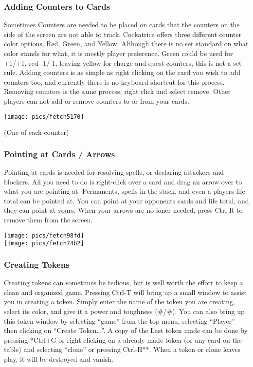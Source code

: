 \documentclass[a4paper]{scrbook}
\begin{document}
\subsubsection{Adding Counters to Cards}
Sometimes Counters are needed to be placed on cards that the counters on the side of the screen are not able to track. Cockatrice offers three different counter color options, Red, Green, and Yellow. Although there is no set standard on what color stands for what, it is mostly player preference. Green could be used for +1/+1, red -1/-1, leaving yellow for charge and quest counters, this is not a set rule. Adding counters is as simple as right clicking on the card you wish to add counters too, and currently there is no keyboard shortcut for this process. Removing counters is the same process, right click and select remove. Other players can not add or remove counters to or from your cards.

\begin{center}
\texttt{[image: pics/fetch5170]}
\end{center}
(One of each counter)

\subsubsection{Pointing at Cards / Arrows}
Pointing at cards is needed for resolving spells, or declaring attackers and blockers. All you need to do is right-click over a card and drag an arrow over to what you are pointing at. Permanents, spells in the stack, and even a players life total can be pointed at. You can point at your opponents cards and life total, and they can point at yours. When your arrows are no loner needed, press Ctrl-R to remove them from the screen.

\begin{center}
\texttt{[image: pics/fetch98fd]} \\
\texttt{[image: pics/fetch74b2]}
\end{center}

\subsubsection{Creating Tokens}
Creating tokens can sometimes be tedious, but is well worth the effort to keep a clean and organized game. Pressing Ctrl-T will bring up a small window to assist you in creating a token. Simply enter the name of the token you are creating, select its color, and give it a power and toughness (\#/\#). You can also bring up this token window by selecting “game” from the top menu, selecting “Player” then clicking on “Create Token…”. A copy of the Last token made can be done by pressing *Ctrl+G or right-clicking on a already made token (or any card on the table) and selecting “clone” or pressing Ctrl-H**. When a token or clone leaves play, it will be destroyed and vanish.
\end{document}
